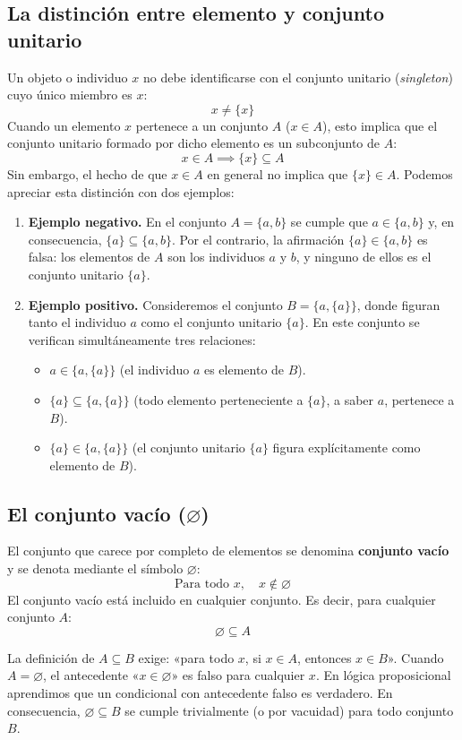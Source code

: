 \subsection{La distinción entre elemento y conjunto unitario}
Un objeto o individuo $x$ no debe identificarse con el conjunto unitario (\emph{singleton}) cuyo único miembro es $x$:
\[
x \neq \{x\}
\]
Cuando un elemento $x$ pertenece a un conjunto $A$ ($x \in A$), esto implica que el conjunto unitario formado por dicho elemento es un subconjunto de $A$:
\[
x \in A \implies \{x\} \subseteq A
\]
Sin embargo, el hecho de que $x \in A$ en general no implica
que $\{x\} \in A$. Podemos apreciar esta distinción con dos ejemplos:
\begin{enumerate}
    \item \textbf{Ejemplo negativo.} En el conjunto $A = \{a, b\}$ se cumple que $a \in \{a, b\}$ y, en consecuencia, $\{a\} \subseteq \{a, b\}$. Por el contrario, la afirmación $\{a\} \in \{a, b\}$ es falsa: los elementos de $A$ son los individuos $a$ y $b$, y ninguno de ellos es el conjunto unitario $\{a\}$. 
    
    \item \textbf{Ejemplo positivo.} Consideremos el conjunto $B = \{a, \{a\}\}$, donde figuran tanto el individuo $a$ como el conjunto unitario $\{a\}$. En este conjunto se verifican simultáneamente tres relaciones:
    \begin{itemize}
        \item $a \in \{a, \{a\}\}$ \quad (el individuo $a$ es elemento de $B$).
        \item $\{a\} \subseteq \{a, \{a\}\}$ \quad (todo elemento perteneciente a $\{a\}$, a saber $a$, pertenece a $B$).
        \item $\{a\} \in \{a, \{a\}\}$ \quad (el conjunto unitario $\{a\}$ figura explícitamente como elemento de $B$).
    \end{itemize}
\end{enumerate}

\subsection{El conjunto vacío (\texorpdfstring{$\varnothing$}{vacio})}
El conjunto que carece por completo de elementos se denomina
\textbf{conjunto vacío} y se denota mediante el símbolo $\varnothing$: 
\[
\text{Para todo } x, \quad x \notin \varnothing
\]
El conjunto vacío está incluido en cualquier conjunto. Es decir, para cualquier conjunto $A$:
\[
\varnothing \subseteq A
\]
\begin{nota}
  La definición de $A \subseteq B$ exige: «para todo $x$, si $x \in A$, entonces
  $x \in B$». Cuando $A = \varnothing$, el antecedente
  «$x \in \varnothing$» es falso para cualquier $x$. En
  lógica proposicional aprendimos que un condicional con
  antecedente falso es verdadero. En consecuencia,
  $\varnothing \subseteq B$ se cumple trivialmente (o por vacuidad) para todo conjunto
  $B$.
\end{nota}

